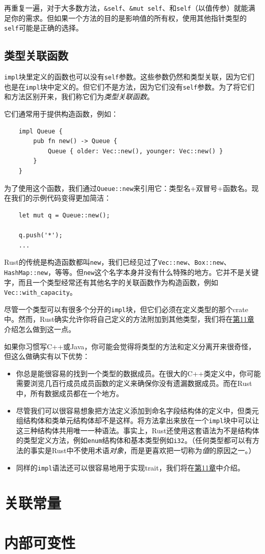 再重复一遍，对于大多数方法，\texttt{\&self}、\texttt{\&mut self}、和\texttt{self}（以值传参）就能满足你的需求。但如果一个方法的目的是影响值的所有权，使用其他指针类型的\texttt{self}可能是正确的选择。

\subsection{类型关联函数}
\texttt{impl}块里定义的函数也可以没有\texttt{self}参数。这些参数仍然和类型关联，因为它们也是在\texttt{impl}块中定义的。但它们不是方法，因为它们没有\texttt{self}参数。为了将它们和方法区别开来，我们称它们为\emph{类型关联函数}。

它们通常用于提供构造函数，例如：
\begin{verbatim}
    impl Queue {
        pub fn new() -> Queue {
            Queue { older: Vec::new(), younger: Vec::new() }
        }
    }
\end{verbatim}

为了使用这个函数，我们通过\texttt{Queue::new}来引用它：类型名+双冒号+函数名。现在我们的示例代码变得更加简洁：
\begin{verbatim}
    let mut q = Queue::new();

    q.push('*');
    ...
\end{verbatim}

Rust的传统是构造函数都叫\texttt{new}，我们已经见过了\texttt{Vec::new}、\texttt{Box::new}、\texttt{HashMap::new}，等等。但\texttt{new}这个名字本身并没有什么特殊的地方。它并不是关键字，而且一个类型经常还有其他名字的关联函数作为构造函数，例如\texttt{Vec::with\_capacity}。

尽管一个类型可以有很多个分开的\texttt{impl}块，但它们必须在定义类型的那个crate中。然而，Rust确实允许你将自己定义的方法附加到其他类型，我们将在\hyperref[ch11]{第11章}介绍怎么做到这一点。

如果你习惯写C++或Java，你可能会觉得将类型的方法和定义分离开来很奇怪，但这么做确实有以下优势：
\begin{itemize}
    \item 你总是能很容易的找到一个类型的数据成员。在很大的C++类定义中，你可能需要浏览几百行成员成员函数的定义来确保你没有遗漏数据成员。而在Rust中，所有数据成员都在一个地方。
    \item 尽管我们可以很容易想象把方法定义添加到命名字段结构体的定义中，但类元组结构体和类单元结构体却不是这样。将方法拿出来放在一个\texttt{impl}块中可以让这三种结构体共用唯一一种语法。事实上，Rust还使用这套语法为不是结构体的类型定义方法，例如\texttt{enum}结构体和基本类型例如\texttt{i32}。（任何类型都可以有方法的事实是Rust中不使用术语\emph{对象}，而是更喜欢把一切称为\emph{值}的原因之一。）
    \item 同样的\texttt{impl}语法还可以很容易地用于实现trait，我们将在\hyperref[ch11]{第11章}中介绍。
\end{itemize}

\section{关联常量}


\section{内部可变性}\label{intermut}
